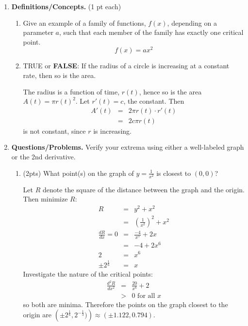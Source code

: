 \documentclass[11pt,letterpaper]{article}
\begin{document}
\begin{enumerate}
\item \textbf{Definitions/Concepts.} (1 pt each)
\begin{enumerate}
 \item Give an example of a family of functions, $f(x)$, depending on a parameter $a$, such that each member of the family has exactly one critical point.
\[f(x)=ax^2\]

\vspace{.5pc}
\item TRUE or \textbf{FALSE}: If the radius of a circle is increasing at a constant rate, then so is the area.

\vspace{.5pc}
The radius is a function of time, $r(t)$, hence so is the area $A(t)=\pi r(t)^2$.  Let $r'(t)=c$, the constant.  Then
\begin{eqnarray*}
 A'(t) &=& 2\pi r(t)\cdot r'(t) \\
&=& 2c\pi r(t) 
\end{eqnarray*}
is not constant, since $r$ is increasing.
\end{enumerate}

\vspace{1pc}
\item \textbf{Questions/Problems.}  Verify your extrema using either a well-labeled graph or the 2nd derivative.
\begin{enumerate}
 \item (2pts) What point(s) on the graph of $y=\frac{1}{x^2}$ is closest to
$(0,0)$?

\vspace{.5pc}
Let $R$ denote the square of the distance between the graph and the origin.  Then minimize $R$:
\begin{eqnarray*}
R &=& y^2+x^2 \\
&=& \left(\frac{1}{x^2}\right)^2+x^2 \\
 \frac{dR}{dx} =0 &=& \frac{-4}{x^5}+2x \\
&=& -4+2x^6 \\
2 &=& x^6 \\
\pm 2^{\frac{1}{6}} &=& x 
\end{eqnarray*}
Investigate the nature of the critical points:
\begin{eqnarray*}
 \frac{d^2R}{dx^2} &=& \frac{20}{x^6}+2 \\
&>& 0 \text{ for all }x
\end{eqnarray*}
so both are minima.  Therefore the points on the graph closest to the origin are $\left(\pm 2^{\frac{1}{6}}, 2^{-\frac{1}{3}})\right)\approx (\pm 1.122, 0.794)$.


\end{enumerate}
\end{enumerate}
\end{document}
